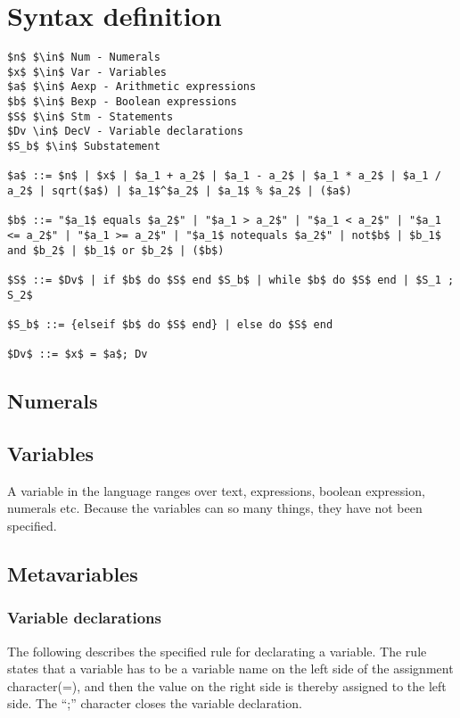 \section{Syntax definition}\label{sec:anlysis:syntax-definition}
\begin{lstlisting}[mathescape, captionpos=b, caption={Syntax formation rules}, label={lst:syntax-formation}]
$n$ $\in$ Num - Numerals
$x$ $\in$ Var - Variables
$a$ $\in$ Aexp - Arithmetic expressions
$b$ $\in$ Bexp - Boolean expressions
$S$ $\in$ Stm - Statements
$Dv \in$ DecV - Variable declarations
$S_b$ $\in$ Substatement

$a$ ::= $n$ | $x$ | $a_1 + a_2$ | $a_1 - a_2$ | $a_1 * a_2$ | $a_1 / a_2$ | sqrt($a$) | $a_1$^$a_2$ | $a_1$ % $a_2$ | ($a$)

$b$ ::= "$a_1$ equals $a_2$" | "$a_1 > a_2$" | "$a_1 < a_2$" | "$a_1 <= a_2$" | "$a_1 >= a_2$" | "$a_1$ notequals $a_2$" | not$b$ | $b_1$ and $b_2$ | $b_1$ or $b_2$ | ($b$)

$S$ ::= $Dv$ | if $b$ do $S$ end $S_b$ | while $b$ do $S$ end | $S_1 ; S_2$

$S_b$ ::= {elseif $b$ do $S$ end} | else do $S$ end

$Dv$ ::= $x$ = $a$; Dv
\end{lstlisting}

\subsection{Numerals}

\subsection{Variables}
A variable in the language ranges over text, expressions, boolean expression, numerals etc. Because the variables can so many things, they have not been specified. 

\subsection{Metavariables}

\subsubsection{Variable declarations}\label{sec:analysis:syntax-definition:variable-declaration}
The following describes the specified rule for declarating a variable. The rule states that a variable has to be a variable name on the left side of the assignment character(=), and then the value on the right side is thereby assigned to the left side. The ``;'' character closes the variable declaration.

